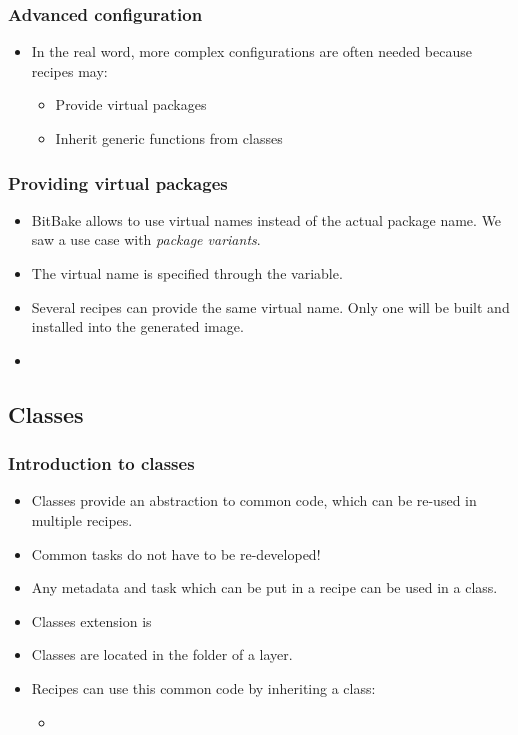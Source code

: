 \begin{frame}
  \frametitle{Advanced configuration}
  \begin{itemize}
    \item In the real word, more complex configurations are often needed
          because recipes may:
    \begin{itemize}
      \item Provide virtual packages
      \item Inherit generic functions from classes
    \end{itemize}
  \end{itemize}
\end{frame}

\begin{frame}
  \frametitle{Providing virtual packages}
  \begin{itemize}
    \item BitBake allows to use virtual names instead of the actual
          package name. We saw a use case with \emph{package
          variants}.
    \item The virtual name is specified through the 
          variable.
    \item Several recipes can provide the same virtual name. Only one
          will be built and installed into the generated image.
    \item {}
  \end{itemize}
\end{frame}

\subsection{Classes}

\begin{frame}
  \frametitle{Introduction to classes}
  \begin{itemize}
    \item Classes provide an abstraction to common code, which can be
          re-used in multiple recipes.
    \item Common tasks do not have to be re-developed!
    \item Any metadata and task which can be put in a recipe can be
          used in a class.
    \item Classes extension is 
    \item Classes are located in the  folder of a layer.
    \item Recipes can use this common code by inheriting a class:
    \begin{itemize}
      \item {}
    \end{itemize}
  \end{itemize}
\end{frame}

